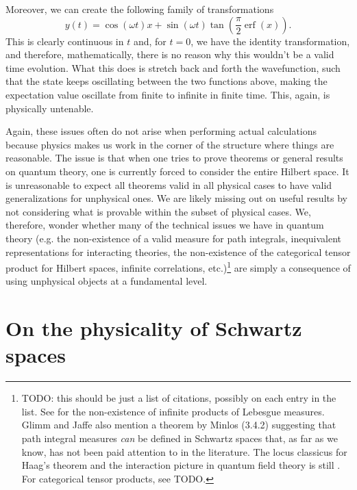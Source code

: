\documentclass[10pt,twocolumn, nofootinbib]{revtex4-2}
\DeclareMathOperator{\erf}{erf}
\begin{document}
Moreover, we can create the following family of transformations
\begin{equation}
y(t) = \cos(\omega t) x + \sin(\omega t) \tan \left(\frac{\pi}{2}\erf(x)\right).
\end{equation}
This is clearly continuous in $t$ and, for $t=0$, we have the identity transformation, and therefore, mathematically, there is no reason why this wouldn't be a valid time evolution. %
What this does is stretch back and forth the wavefunction, such that the state keeps oscillating between the two functions above, making the expectation value oscillate from finite to infinite in finite time. This, again, is physically untenable.

Again, these issues often do not arise when performing actual calculations because physics makes us work in the corner of the structure where things are reasonable. The issue is that when one tries to prove theorems or general results on quantum theory, one is currently forced to consider the entire Hilbert space. It is unreasonable to expect all theorems valid in all physical cases to have valid generalizations for unphysical ones. We are likely missing out on useful results by not considering what is provable within the subset of physical cases. We, therefore, wonder whether many of the technical issues we have in quantum theory (e.g. the non-existence of a valid measure for path integrals, inequivalent representations for interacting theories, the non-existence of the categorical tensor product for Hilbert spaces, infinite correlations, etc.)\footnote{TODO: this should be just a list of citations, possibly on each entry in the list. See \cite[\S A.4]{glimm_quantum_1987} for the non-existence of infinite products of Lebesgue measures. Glimm and Jaffe also mention a theorem by Minlos (3.4.2) suggesting that path integral measures \textit{can} be defined in Schwartz spaces that, as far as we know, has not been paid attention to in the literature. The locus classicus for Haag's theorem and the interaction picture in quantum field theory is still \cite{earman_haags_2006}. For categorical tensor products, see TODO.}  are simply a consequence of using unphysical objects at a fundamental level.

\section{On the physicality of Schwartz spaces}
\end{document}
